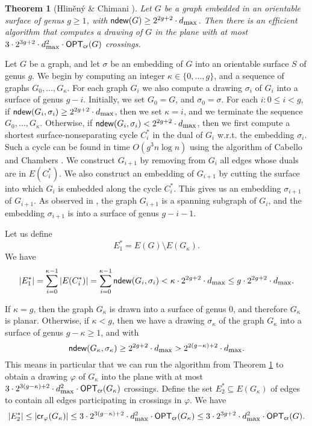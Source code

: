 \documentclass[twoside,leqno,twocolumn]{article}
\newtheorem{theorem}{Theorem}
\renewcommand{\phi}{\varphi}
\newcommand{\optcro}[1]{\mathsf{OPT}_{\mathsf{cr}}(#1)}
\newcommand{\cro}{\mathsf{cr}}
\newcommand{\dmax}{d_{\mbox{\textup{\footnotesize{max}}}}}
\newcommand{\ndew}{\mathsf{ndew}}
\begin{document}
\begin{theorem}[Hlin\v{e}n\'{y} \& Chimani \cite{crossing_genus}]\label{thm:genus_soda}
Let $G$ be a graph embedded in an orientable surface of genus $g\geq 1$, with $\ndew(G) \geq 2^{2g+2}\cdot \dmax$.
Then there is an efficient algorithm that computes a drawing of $G$ in the plane with at most $3\cdot 2^{3g+2} \cdot \dmax^2 \cdot \optcro{G}$ crossings.
\end{theorem}

Let $G$ be a graph, and let $\sigma$ be an embedding of $G$ into an orientable surface $S$ of genus $g$.
We begin by computing an integer ${\kappa}\in \{0,\ldots,g\}$, and a sequence of graphs $G_0,\ldots,G_{\kappa}$.
For each graph $G_i$ we also compute a drawing $\sigma_i$ of $G_i$ into a surface of genus $g-i$.
Initially, we set $G_0 = G$, and $\sigma_0 = \sigma$.
For each $i:0\leq i<g$, if $\ndew(G_i,\sigma_i)\geq 2^{2g+2}\cdot \dmax$, then we set ${\kappa}=i$, and we terminate the sequence $G_0,\ldots,G_{\kappa}$.
Otherwise, if $\ndew(G_i,\sigma_i) < 2^{2g+2} \cdot \dmax$, then 
we first compute a shortest surface-nonseparating cycle $C_i^*$ in the dual of $G_i$ w.r.t. the embedding $\sigma_i$. Such a cycle can be found in time $O(g^3 n \log n)$ using the
algorithm of Cabello and Chambers \cite{CabelloC07}.
We construct $G_{i+1}$ by removing from $G_i$ all edges whose duals are in $E(C_i^*)$.
We also construct an embedding of $G_{i+1}$ by cutting the surface into which $G_i$ is embedded along the cycle $C_i^*$.
This gives us an embedding $\sigma_{i+1}$ of $G_{i+1}$.
As observed in \cite{crossing_genus}, the graph $G_{i+1}$ is a spanning subgraph of $G_i$, and the embedding $\sigma_{i+1}$ is into a surface of genus $g-i-1$.

Let us define
\[
E^*_1 = E(G)\setminus E(G_{\kappa}).
\]
We have
\begin{align}
|E^*_1| = \sum_{i=0}^{{\kappa}-1} |E(C_i^*)| = \sum_{i=0}^{{\kappa}-1} \ndew(G_i, \sigma_i) < {\kappa} \cdot 2^{2g+2} \cdot \dmax \leq g\cdot 2^{2g+2} \cdot \dmax. \label{eq:genus1}
\end{align}

If ${\kappa}=g$, then the graph $G_{\kappa}$ is drawn into a surface of genus $0$, and therefore $G_{\kappa}$ is planar.
Otherwise, if ${\kappa}<g$, then we have a drawing $\sigma_{\kappa}$ of the graph $G_{\kappa}$ into a surface of genus $g-{\kappa}\geq 1$, and with
\[
\ndew(G_{\kappa}, \sigma_{\kappa})\geq 2^{2g+2}\cdot \dmax > 2^{2(g-{\kappa})+2}\cdot \dmax.
\]
This means in particular that we can run the algorithm from Theorem \ref{thm:genus_soda} to obtain a drawing $\phi$ of $G_{\kappa}$ into the plane with at most $3\cdot 2^{3(g-{\kappa})+2} \cdot \dmax^2 \cdot \optcro{G_{\kappa}}$ crossings.
Define the set $E^*_2\subseteq E(G_{\kappa})$ of edges to contain all edges participating in crossings in $\phi$.
We have
\begin{align}
|E^*_2| \leq |\cro_\phi(G_{\kappa})| \leq 3\cdot 2^{3(g-{\kappa})+2} \cdot \dmax^2 \cdot \optcro{G_{\kappa}} \leq 3\cdot 2^{3g+2} \cdot \dmax^2 \cdot \optcro{G}. \label{eq:genus2}
\end{align}
\end{document}
